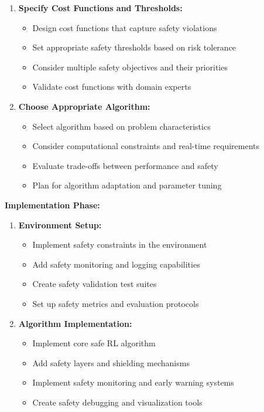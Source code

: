 \documentclass[12pt]{article}
\begin{document}
{{{{\begin{enumerate}
\item \textbf{Specify Cost Functions and Thresholds:}
   \begin{itemize}
   \item Design cost functions that capture safety violations
   \item Set appropriate safety thresholds based on risk tolerance
   \item Consider multiple safety objectives and their priorities
   \item Validate cost functions with domain experts
   \end{itemize}

\item \textbf{Choose Appropriate Algorithm:}
   \begin{itemize}
   \item Select algorithm based on problem characteristics
   \item Consider computational constraints and real-time requirements
   \item Evaluate trade-offs between performance and safety
   \item Plan for algorithm adaptation and parameter tuning
   \end{itemize}
\end{enumerate}

\textbf{Implementation Phase:}
\begin{enumerate}
\item \textbf{Environment Setup:}
   \begin{itemize}
   \item Implement safety constraints in the environment
   \item Add safety monitoring and logging capabilities
   \item Create safety validation test suites
   \item Set up safety metrics and evaluation protocols
   \end{itemize}

\item \textbf{Algorithm Implementation:}
   \begin{itemize}
   \item Implement core safe RL algorithm
   \item Add safety layers and shielding mechanisms
   \item Implement safety monitoring and early warning systems
   \item Create safety debugging and visualization tools
   \end{itemize}


\end{enumerate}}}}}
\end{document}
